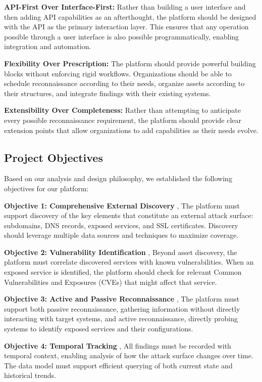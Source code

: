 \documentclass[a4paper,12pt]{report}
\begin{document}
\textbf{API-First Over Interface-First:} Rather than building a user interface and then adding API capabilities as an afterthought, the platform should be designed with the API as the primary interaction layer. This ensures that any operation possible through a user interface is also possible programmatically, enabling integration and automation.\hfill \break

\textbf{Flexibility Over Prescription:} The platform should provide powerful building blocks without enforcing rigid workflows. Organizations should be able to schedule reconnaissance according to their needs, organize assets according to their structures, and integrate findings with their existing systems.\hfill \break

\textbf{Extensibility Over Completeness:} Rather than attempting to anticipate every possible reconnaissance requirement, the platform should provide clear extension points that allow organizations to add capabilities as their needs evolve.\hfill \break

\subsection{Project Objectives}

Based on our analysis and design philosophy, we established the following objectives for our platform:\hfill \break

\textbf{Objective 1: Comprehensive External Discovery} ,  The platform must support discovery of the key elements that constitute an external attack surface: subdomains, DNS records, exposed services, and SSL certificates. Discovery should leverage multiple data sources and techniques to maximize coverage.\hfill \break

\textbf{Objective 2: Vulnerability Identification} ,  Beyond asset discovery, the platform must correlate discovered services with known vulnerabilities. When an exposed service is identified, the platform should check for relevant Common Vulnerabilities and Exposures (CVEs) that might affect that service.\hfill \break

\textbf{Objective 3: Active and Passive Reconnaissance} ,  The platform must support both passive reconnaissance, gathering information without directly interacting with target systems, and active reconnaissance, directly probing systems to identify exposed services and their configurations.\hfill \break

\textbf{Objective 4: Temporal Tracking} ,  All findings must be recorded with temporal context, enabling analysis of how the attack surface changes over time. The data model must support efficient querying of both current state and historical trends.\hfill \break
\end{document}
